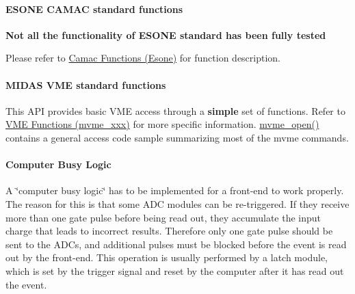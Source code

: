 \label{FE_camac_vme_function_calls_idx_hardware_CAMAC_functions_ESONE}
\hypertarget{FE_camac_vme_function_calls_idx_hardware_CAMAC_functions_ESONE}{}
 

 \hypertarget{FE_camac_vme_function_calls_FE_ESONE_CAMAC_standard_functions}{}\paragraph{ESONE CAMAC standard functions}\label{FE_camac_vme_function_calls_FE_ESONE_CAMAC_standard_functions}
{\bfseries Not all the functionality of ESONE standard has been fully tested}

Please refer to \hyperlink{group__mesonefunctionc}{Camac Functions (Esone)} for function description.

\label{FE_camac_vme_function_calls_idx_hardware_standard_interface_VME}
\hypertarget{FE_camac_vme_function_calls_idx_hardware_standard_interface_VME}{}
 

 \hypertarget{FE_camac_vme_function_calls_FE_Midas_VME_standard_functions}{}\paragraph{MIDAS VME standard functions}\label{FE_camac_vme_function_calls_FE_Midas_VME_standard_functions}
This API provides basic VME access through a {\bfseries simple} set of functions. Refer to \hyperlink{group__mvmestdfunctionh}{VME Functions (mvme\_\-xxx)} for more specific information. \hyperlink{group__mvmestdfunctionh_ga13db7fc7c7c022e46fadd8fc4dc40047}{mvme\_\-open()} contains a general access code sample summarizing most of the mvme commands.

\label{FE_camac_vme_function_calls_idx_hardware_computer-busy}
\hypertarget{FE_camac_vme_function_calls_idx_hardware_computer-busy}{}
 

 \hypertarget{FE_camac_vme_function_calls_FE_Compute_Busy_Logic}{}\paragraph{Computer Busy Logic}\label{FE_camac_vme_function_calls_FE_Compute_Busy_Logic}
A \char`\"{}computer busy logic\char`\"{} has to be implemented for a front-\/end to work properly. The reason for this is that some ADC modules can be re-\/triggered. If they receive more than one gate pulse before being read out, they accumulate the input charge that leads to incorrect results. Therefore only one gate pulse should be sent to the ADCs, and additional pulses must be blocked before the event is read out by the front-\/end. This operation is usually performed by a latch module, which is set by the trigger signal and reset by the computer after it has read out the event.

